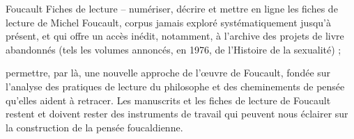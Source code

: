 Foucault Fiches de lecture -- 
numériser, décrire et mettre en ligne les fiches de lecture de Michel Foucault, corpus jamais exploré systématiquement jusqu’à présent, et qui offre un accès inédit, notamment, à l’archive des projets de livre abandonnés (tels les volumes annoncés, en 1976, de l’Histoire de la sexualité) ;

permettre, par là, une nouvelle approche de l’œuvre de Foucault, fondée sur l’analyse des pratiques de lecture du philosophe et des cheminements de pensée qu’elles aident à retracer. Les manuscrits et les fiches de lecture de Foucault restent et doivent rester des instruments de travail qui peuvent nous éclairer sur la construction de la pensée foucaldienne.









